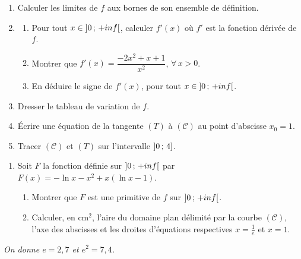 \begin{devoirsurveille}
\begin{enumerate}[label=\textbf{\arabic*.}, leftmargin=*, itemsep=0.25em]
  \item Calculer les limites de $f$ aux bornes de son ensemble de
        définition. 
  \item \begin{enumerate}[label=\textbf{\alph*)}, leftmargin=1.4em, itemsep=0.15em]
      \item Pour tout $x \in \left]0\,;\,+inf\right[$, calculer $f'(x)$ où
            $f'$ est la fonction dérivée de $f$. 
      \item Montrer que $f'(x) = \dfrac{-2x^{2}+x+1}{x^{2}}$,
            $\forall\, x>0$. 
      \item En déduire le signe de $f'(x)$, pour tout
            $x \in \left]0\,;\,+inf\right[$. 
    \end{enumerate}
  \item Dresser le tableau de variation de $f$. 
  \item Écrire une équation de la tangente $(T)$ à $(\mathcal C)$ au point
        d'abscisse $x_{0} = 1$. 
  \item Tracer $(\mathcal C)$ et $(T)$ sur l'intervalle
        $\left]0\,;\,4\right]$. 
\end{enumerate}

\begin{enumerate}[label=\textbf{\arabic*.}, leftmargin=*, itemsep=0.25em, start=6]
  \item Soit $F$ la fonction définie sur $\left]0\,;\,+inf\right[$ par
        $F(x) = -\ln x-x^{2}+x\left(\ln x-1\right)$.
    \begin{enumerate}[label=\textbf{\alph*)}, leftmargin=1.4em, itemsep=0.15em]
      \item Montrer que $F$ est une primitive de $f$ sur
            $\left]0\,;\,+inf\right[$. 
      \item Calculer, en $\text{cm}^{2}$, l'aire du domaine plan délimité
            par la courbe $(\mathcal C)$, l'axe des abscisses et les droites
            d'équations respectives $x = \frac1e$ et $x = 1$.
    \end{enumerate}
\end{enumerate}

\vspace{0.4em}
\noindent\emph{On donne $e = 2{,}7$ et $e^{2} = 7{,}4$.}
\end{devoirsurveille}

